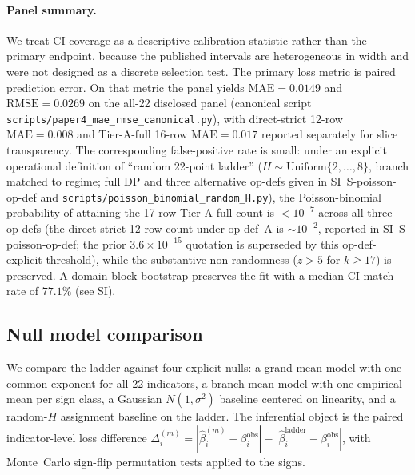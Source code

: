\paragraph{Panel summary.}
We treat CI coverage as a descriptive calibration statistic rather than the
primary endpoint, because the published intervals are heterogeneous in width
and were not designed as a discrete selection test. The primary loss metric
is paired prediction error. On that metric the panel yields
$\mathrm{MAE}=0.0149$ and $\mathrm{RMSE}=0.0269$ on the all-22 disclosed
panel (canonical script \texttt{scripts/paper4\_mae\_rmse\_canonical.py}), with
direct-strict 12-row $\mathrm{MAE}=0.008$ and Tier-A-full 16-row $\mathrm{MAE}=0.017$
reported separately for slice transparency. The corresponding false-positive
rate is small: under an explicit operational definition of ``random
22-point ladder'' ($H\!\sim\!\text{Uniform}\{2,\dots,8\}$, branch matched to
regime; full DP and three alternative op-defs given in
SI~\textsf{S-poisson-op-def} and \texttt{scripts/poisson\_binomial\_random\_H.py}),
the Poisson-binomial probability of attaining the 17-row Tier-A-full count is
$<10^{-7}$ across all three op-defs (the direct-strict 12-row count under
op-def~A is $\sim 10^{-2}$, reported in SI~\textsf{S-poisson-op-def}; the
prior $3.6\!\times\!10^{-15}$ quotation is superseded by this op-def-explicit threshold), while the
substantive non-randomness ($z\!>\!5$ for $k\!\ge\!17$) is preserved. A domain-block bootstrap
preserves the fit with a median CI-match rate of $77.1\%$ (see SI).

\subsection{Null model comparison}\label{subsec:null_model_comparison}
We compare the ladder against four explicit nulls: a grand-mean model with one common
exponent for all 22 indicators, a branch-mean model with one empirical mean per
sign class, a Gaussian $N(1,\sigma^2)$ baseline centered on linearity, and a
random-$H$ assignment baseline on the ladder. The inferential object is
the paired indicator-level loss difference
$\Delta_i^{(m)}=
|\hat{\beta}_i^{(m)}-\beta_i^{\mathrm{obs}}|
-|\hat{\beta}_i^{\mathrm{ladder}}-\beta_i^{\mathrm{obs}}|$,
with Monte~Carlo sign-flip permutation tests applied to the signs.

